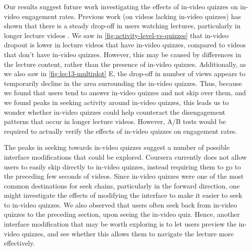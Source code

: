 \documentclass{sigchi}
\begin{document}
Our results suggest future work investigating the effects of in-video quizzes on in-video engagement rates. Previous work (on videos lacking in-video quizzes) has shown that there is a steady drop-off in users watching lectures, particularly in longer lecture videos \cite{juho}. We saw in \autoref{fig:activity-level-vs-quizzes} that in-video dropout is lower in lecture videos that have in-video quizzes, compared to videos that don't have in-video quizzes. However, this may be caused by differences in the lecture content, rather than the presence of in-video quizzes. Additionally, as we also saw in \autoref{fig:lec13-multiplot} E, the drop-off in number of views appears to temporarily decline in the area surrounding the in-video quizzes. Thus, because we found that users tend to answer in-video quizzes and not skip over them, and we found peaks in seeking activity around in-video quizzes, this leads us to wonder whether in-video quizzes could help counteract the disengagement patterns that occur in longer lecture videos. However, A/B tests would be required to actually verify the effects of in-video quizzes on engagement rates.



The peaks in seeking towards in-video quizzes suggest a number of possible interface modifications that could be explored. Coursera currently does not allow users to easily skip directly to in-video quizzes, instead requiring them to go to the preceding few seconds of videos. Since in-video quizzes were one of the most common destinations for seek chains, particularly in the forward direction, one might investigate the effects of modifying the interface to make it easier to seek to in-video quizzes. We also observed that users often seek back from in-video quizzes to the preceding section, upon seeing the in-video quiz. Hence, another interface modification that may be worth exploring is to let users preview the in-video quizzes, and see whether this allows them to navigate the lecture more effectively. %
\end{document}
